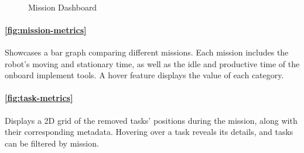 \begin{figure}[htb]
    \myfloatalign
     \quad
     \\
    \caption{Mission Dashboard}\label{fig:mission-dashboard}
\end{figure}


\paragraph{\autoref{fig:mission-metrics}} Showcases a bar graph comparing different missions. Each mission includes the robot's moving and stationary time, as well as the idle and productive time of the onboard implement tools. A hover feature displays the value of each category.

\paragraph{\autoref{fig:task-metrics}} Displays a 2D grid of the removed tasks' positions during the mission, along with their corresponding metadata. Hovering over a task reveals its details, and tasks can be filtered by mission.

